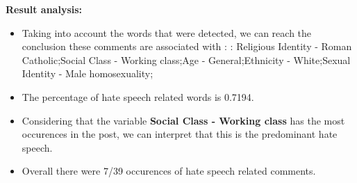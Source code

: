 \documentclass[11pt]{article}
\begin{document}
\textbf{\Large Result analysis:}

\begin{itemize}\item Taking into account the words that were detected, we can reach the conclusion these comments are associated with : : Religious Identity - Roman Catholic;Social Class - Working class;Age - General;Ethnicity - White;Sexual Identity - Male homosexuality;%

\item The percentage of hate speech related words is 0.7194.

\item Considering that the variable \textbf{Social Class - Working class} has the most occurences in the post, we can interpret that this is the predominant hate speech.

\item Overall there were 7/39 occurences of hate speech related comments.\end{itemize}
\end{document}
